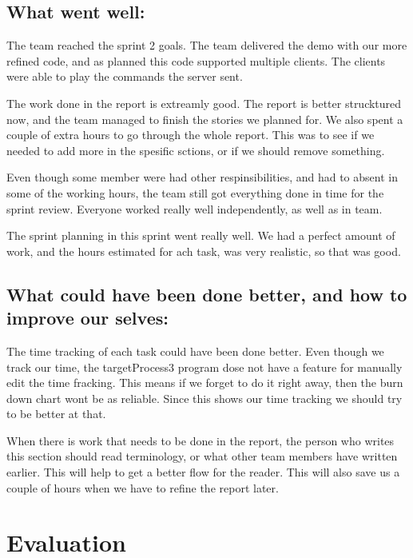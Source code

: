 \subsection{What went well:}
The team reached the sprint 2 goals. The team delivered the demo with our more refined code, and as planned this code supported multiple clients. The clients were able to play the commands the server sent.

The work done in the report is extreamly good. The report is better strucktured now, and the team managed to finish the stories we planned for. We also spent a couple of extra hours to go through the whole report. This was to see if we needed to add more in the spesific sctions, or if we should remove something.  

Even though some member were had other respinsibilities, and had to absent in some of the working hours, the team still got everything done in time for the sprint review. Everyone worked really well independently, as well as in team. 

The sprint planning in this sprint went really well. We had a perfect amount of work, and the hours estimated for ach task, was very realistic, so that was good. 


\subsection{What could have been done better, and how to improve our selves:}
The time tracking of each task could have been done better. 
Even though we track our time, the targetProcess3 program dose not have a feature for manually edit the time fracking. 
This means if we forget to do it right away, then the burn down chart wont be as reliable. Since this shows our time tracking we should try to be better at that.

When there is work that needs to be done in the report, the person who writes this section should read terminology, or what other team members have written earlier. This will help to get a better flow for the reader.
This will also save us a couple of hours when we have to refine the report later. 

\section{Evaluation}